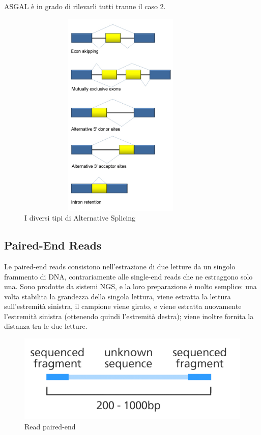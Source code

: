 ASGAL è in grado di rilevarli tutti tranne il caso 2.

\newpage

\begin{figure}[t!]
	\centering
	\includegraphics[height=10cm,width=10cm]{images/alternativesplicingevents.jpg}
  \caption{I diversi tipi di Alternative Splicing}
  \label{fig:AlternativeSplicingTypes}
\end{figure}

\subsection{Paired-End Reads}
Le paired-end reads consistono nell'estrazione di due letture da un singolo frammento di DNA, contrariamente alle single-end reads che ne estraggono solo una. Sono prodotte da sistemi NGS, e la loro preparazione è molto semplice: una volta stabilita la grandezza della singola lettura, viene estratta la lettura sull'estremità sinistra, il campione viene girato, e viene estratta nuovamente l'estremità sinistra (ottenendo quindi l'estremità destra); viene inoltre fornita la distanza tra le due letture.

\begin{figure}[h!]
	\centering
	\includegraphics{images/pairedendreads2.png}
  \caption{Read paired-end}
  \label{fig:PairedEndReads}
\end{figure}
